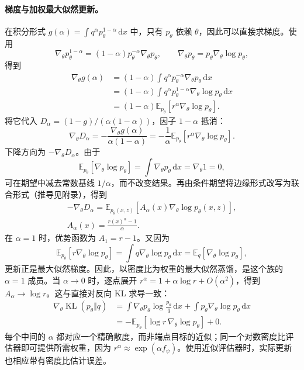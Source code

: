 \documentclass[UTF8,fontset=none,11pt,a4paper]{ctexart}
\newcommand{\E}{\mathbb E}
\newcommand{\KL}{\operatorname{KL}}
\newcommand{\dd}{\,\mathrm d}
\begin{document}
\paragraph{梯度与加权最大似然更新。}
在积分形式 $g(\alpha)=\int q^\alpha p_\theta^{1-\alpha}\dd x$ 中，只有 $p_\theta$ 依赖 $\theta$，因此可以直接求梯度。使用
\[
\nabla_\theta p_\theta^{1-\alpha}
=(1-\alpha)p_\theta^{-\alpha}\nabla_\theta p_\theta,
\qquad
\nabla_\theta p_\theta=p_\theta\nabla_\theta\log p_\theta,
\]
得到
\begin{equation}
\begin{aligned}
\nabla_\theta g(\alpha)
&=(1-\alpha)\int q^\alpha p_\theta^{-\alpha}\nabla_\theta p_\theta\dd x\\
&=(1-\alpha)\int q^\alpha p_\theta^{1-\alpha}\nabla_\theta\log p_\theta\dd x\\
&=(1-\alpha)\E_{p_\theta}[r^\alpha\nabla_\theta\log p_\theta].
\end{aligned}
\label{eq:g-parameter-gradient}
\end{equation}
将它代入 $D_\alpha=(1-g)/(\alpha(1-\alpha))$，因子 $1-\alpha$ 抵消：
\begin{equation}
\nabla_\theta D_\alpha
=-\frac{\nabla_\theta g(\alpha)}{\alpha(1-\alpha)}
=-\frac1\alpha\E_{p_\theta}[r^\alpha\nabla_\theta\log p_\theta].
\label{eq:gradient}
\end{equation}
下降方向为 $-\nabla_\theta D_\alpha$。由于
\[
\E_{p_\theta}[\nabla_\theta\log p_\theta]
=\int\nabla_\theta p_\theta\dd x
=\nabla_\theta1=0,
\]
可在期望中减去常数基线 $1/\alpha$，而不改变结果。再由条件期望将边缘形式改写为联合形式（推导见附录），得到
\begin{equation}
\begin{gathered}
-\nabla_\theta D_\alpha
=\E_{p_\theta(x,z)}
\left[A_\alpha(x)\nabla_\theta\log p_\theta(x,z)\right],\\
A_\alpha(x)=\frac{r(x)^\alpha-1}{\alpha}.
\end{gathered}
\label{eq:advantage}
\end{equation}
在 $\alpha=1$ 时，优势函数为 $A_1=r-1$。又因为
\[
\E_{p_\theta}[r\nabla_\theta\log p_\theta]
=\int q\nabla_\theta\log p_\theta\dd x
=\E_q[\nabla_\theta\log p_\theta],
\]
更新正是最大似然梯度。因此，以密度比为权重的最大似然蒸馏，是这个族的 $\alpha=1$ 成员。当 $\alpha\to0$ 时，逐点展开 $r^\alpha=1+\alpha\log r+O(\alpha^2)$，得到 $A_\alpha\to\log r$。这与直接对反向 KL 求导一致：
\[
\begin{aligned}
\nabla_\theta\KL(p_\theta\Vert q)
&=\int\nabla_\theta p_\theta\log\frac{p_\theta}{q}\dd x
+\int p_\theta\nabla_\theta\log p_\theta\dd x\\
&=-\E_{p_\theta}[\log r\,\nabla_\theta\log p_\theta]+0.
\end{aligned}
\]
每个中间的 $\alpha$ 都对应一个精确散度，而非端点目标的近似；同一个对数密度比评估器即可提供所需权重，因为 $r^\alpha\approx\exp(\alpha f_\psi)$。使用近似评估器时，实际更新也相应带有密度比估计误差。
\end{document}
